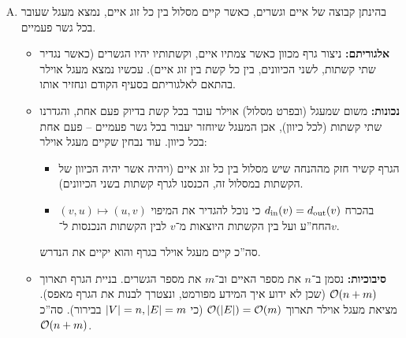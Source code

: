 \documentclass[]{../../../../tex/classes/homework}
\begin{document}
\begin{enumerate}[(A)]
\begin{proof}
\begin{itemize}
				\textit{הערה: }בעבור הסעיף הבא, סיבוכיות האלגוריתם היא $\oc(\sof E)$, שכן הוא עובר בדיוק פעם אחת על כל קשת, וטיפול בקשת אורך זמן קבוע. 
			\end{itemize}\envendproof
		\end{proof}
		\item בהינתן קבוצה של איים וגשרים, כאשר קיים מסלול בין כל זוג איים, נמצא מעגל שעובר בכל גשר פעמיים. 
		\begin{itemize}
			\item \textbf{אלגוריתם: }ניצור גרף מכוון כאשר צמתיו איים, וקשתותיו יהיו הגשרים (כאשר נגדיר שתי קשתות, לשני הכיוונים, בין כל קשת בין זוג איים). עכשיו נמצא מעגל אוילר בהתאם לאלגוריתם בסעיף הקודם ונחזיר אותו. 
			\item \textbf{נכונות: }משום שמעגל (ובפרט מסלול) אוילר עובר בכל קשת בדיוק פעם אחת, והגדרנו שתי קשתות (לכל כיוון), אכן המעגל שיוחזר יעבור בכל גשר פעמיים – פעם אחת בכל כיוון. עוד נבחין שקיים מעגל אוילר: 
			\begin{itemize}
				\item הגרף קשיר חזק מההנחה שיש מסלול בין כל זוג איים (ויהיה אשר יהיה הכיוון של הקשתות במסלול זה, הכנסנו לגרף קשתות בשני הכיוונים). 
				\item בהכרח $d_{\mathrm{in}}(v) = d_{\mathrm{out}}(v)$ כי נוכל להגדיר את המיפוי $(v, u) \mapsto (u, v)$ החח''ע ועל בין הקשתות היוצאות מ־$v$ לבין הקשתות הנכנסות ל־$v$. 
			\end{itemize}
			סה''כ קיים מעגל אוילר בגרף והוא יקיים את הנדרש. 
			\item \textbf{סיבוכיות: }נסמן ב־$n$ את מספר האיים וב־$m$ את מספר הגשרים. בניית הגרף תארוך $\mathcal{O}(n + m)$ (שכן לא ידוע איך המידע מפורמט, ונצטרך לבנות את הגרף מאפס). מציאת מעגל אוילר תארוך $\mathcal{O}(\left \lvert E \right \rvert) = \mathcal{O}(m)$ (כי $\left \lvert V \right \rvert = n, \left \lvert E \right \rvert = m$ בבירור). סה''כ $\mathcal{O}(n + m)$. 
		\end{itemize}
	\end{enumerate}
	
	\npage
	
\end{document}
